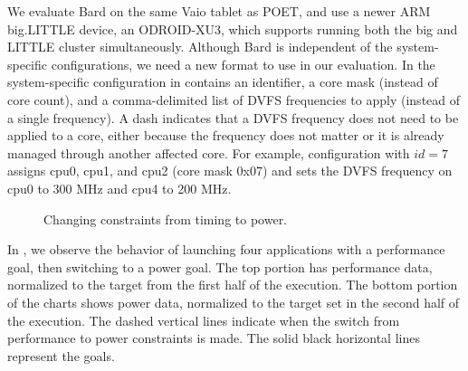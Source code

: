 We evaluate Bard on the same Vaio tablet as POET, and use a newer ARM big.LITTLE device, an ODROID-XU3, which supports running both the big and LITTLE cluster simultaneously.
Although Bard is independent of the system-specific configurations, we need a new format to use in our evaluation.
In the system-specific configuration in  contains an identifier, a core mask (instead of core count), and a comma-delimited list of DVFS frequencies to apply (instead of a single frequency).
A dash indicates that a DVFS frequency does not need to be applied to a core, either because the frequency does not matter or it is already managed through another affected core.
For example, configuration with $id=7$ assigns cpu0, cpu1, and cpu2 (core mask 0x07) and sets the DVFS frequency on cpu0 to 300 MHz and cpu4 to 200 MHz.

\begin{figure}[t]
  \centering
    
  \caption{Changing constraints from timing to power.}
  \label{fig:bard-perf-pwr-change-pick4}
\end{figure}

In , we observe the behavior of launching four applications with a performance goal, then switching to a power goal.
The top portion has performance data, normalized to the target from the first half of the execution.
The bottom portion of the charts shows power data, normalized to the target set in the second half of the execution.
The dashed vertical lines indicate when the switch from performance to power constraints is made.
The solid black horizontal lines represent the goals.


